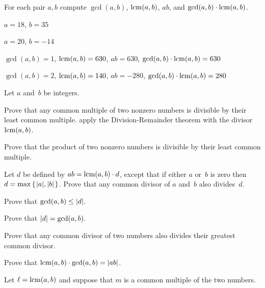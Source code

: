 \documentclass{ibl}  %
\begin{document}
\begin{euclidproof}
\begin{ex}
For each pair $a,b$ compute $\gcd(a,b)$, $\operatorname{lcm}(a,b)$, $ab$, and
$\gcd(a,b)\cdot\operatorname{lcm}(a,b)$.
\begin{exes}
\item $a=18$, $b=35$  
\item $a=20$, $b=-14$
\end{exes}
\begin{ans}
\begin{exes}
\item $\gcd(a,b)=1$, $\operatorname{lcm}(a,b)=630$, $ab=630$, $\gcd(a,b)\cdot\operatorname{lcm}(a,b)=630$
\item $\gcd(a,b)=2$, $\operatorname{lcm}(a,b)=140$, $ab=-280$, $\gcd(a,b)\cdot\operatorname{lcm}(a,b)=280$
\end{exes}
\end{ans}
\end{ex}

\begin{ex} Let $a$ and~$b$ be integers.
\begin{exes}
\item Prove that any common multiple of two nonzero
   numbers is divisible by their 
  least common multiple.
  \hint apply the Division-Remainder theorem with the divisor $\operatorname{lcm}(a,b)$.
\item Prove that the product of two nonzero numbers is divisible by their 
  least common multiple.
\item Let $d$ be defined by 
  $ab=\operatorname{lcm}(a,b)\cdot d$, except that if either $a$ or~$b$ is zero
  then $d=\max\mbox{$\{\hspace{0.1em}\lvert a\rvert,\lvert b\rvert\hspace{0.1em}\}$}$.
  Prove that any common divisor of $a$ and~$b$ also divides~$d$.
\item Prove that $\gcd(a,b)\leq\lvert d\rvert$.
\item Prove that $\lvert d\rvert=\gcd(a,b)$. 
\item Prove that any common divisor of two numbers also divides their
  greatest common divisor.
\item Prove that $\operatorname{lcm}(a,b)\cdot\gcd(a,b)=\lvert ab\rvert$. 
\end{exes}  
\begin{ans}  %
\begin{exes}
\item Let $\ell=\operatorname{lcm}(a,b)$ and suppose that $m$ is a common multiple
  of the two numbers.


\end{exes}
\end{ans}
\end{ex}
\end{euclidproof}
\end{document}

